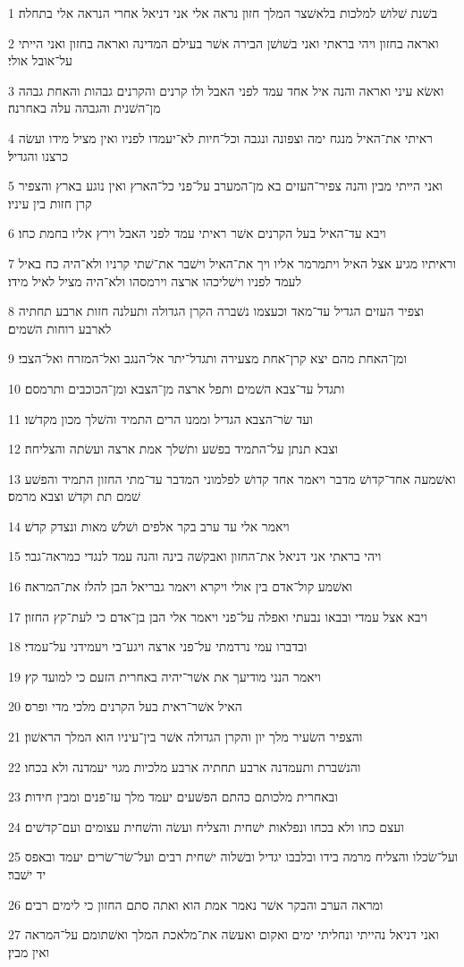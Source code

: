 \par 1 בשׁנת שׁלושׁ למלכות בלאשׁצר המלך חזון נראה אלי אני דניאל אחרי הנראה אלי בתחלה׃
\par 2 ואראה בחזון ויהי בראתי ואני בשׁושׁן הבירה אשׁר בעילם המדינה ואראה בחזון ואני הייתי על־אובל אולי׃
\par 3 ואשׂא עיני ואראה והנה איל אחד עמד לפני האבל ולו קרנים והקרנים גבהות והאחת גבהה מן־השׁנית והגבהה עלה באחרנה׃
\par 4 ראיתי את־האיל מנגח ימה וצפונה ונגבה וכל־חיות לא־יעמדו לפניו ואין מציל מידו ועשׂה כרצנו והגדיל׃
\par 5 ואני הייתי מבין והנה צפיר־העזים בא מן־המערב על־פני כל־הארץ ואין נוגע בארץ והצפיר קרן חזות בין עיניו׃
\par 6 ויבא עד־האיל בעל הקרנים אשׁר ראיתי עמד לפני האבל וירץ אליו בחמת כחו׃
\par 7 וראיתיו מגיע אצל האיל ויתמרמר אליו ויך את־האיל וישׁבר את־שׁתי קרניו ולא־היה כח באיל לעמד לפניו וישׁליכהו ארצה וירמסהו ולא־היה מציל לאיל מידו׃
\par 8 וצפיר העזים הגדיל עד־מאד וכעצמו נשׁברה הקרן הגדולה ותעלנה חזות ארבע תחתיה לארבע רוחות השׁמים׃
\par 9 ומן־האחת מהם יצא קרן־אחת מצעירה ותגדל־יתר אל־הנגב ואל־המזרח ואל־הצבי׃
\par 10 ותגדל עד־צבא השׁמים ותפל ארצה מן־הצבא ומן־הכוכבים ותרמסם׃
\par 11 ועד שׂר־הצבא הגדיל וממנו הרים התמיד והשׁלך מכון מקדשׁו׃
\par 12 וצבא תנתן על־התמיד בפשׁע ותשׁלך אמת ארצה ועשׂתה והצליחה׃
\par 13 ואשׁמעה אחד־קדושׁ מדבר ויאמר אחד קדושׁ לפלמוני המדבר עד־מתי החזון התמיד והפשׁע שׁמם תת וקדשׁ וצבא מרמס׃
\par 14 ויאמר אלי עד ערב בקר אלפים ושׁלשׁ מאות ונצדק קדשׁ׃
\par 15 ויהי בראתי אני דניאל את־החזון ואבקשׁה בינה והנה עמד לנגדי כמראה־גבר׃
\par 16 ואשׁמע קול־אדם בין אולי ויקרא ויאמר גבריאל הבן להלז את־המראה׃
\par 17 ויבא אצל עמדי ובבאו נבעתי ואפלה על־פני ויאמר אלי הבן בן־אדם כי לעת־קץ החזון׃
\par 18 ובדברו עמי נרדמתי על־פני ארצה ויגע־בי ויעמידני על־עמדי׃
\par 19 ויאמר הנני מודיעך את אשׁר־יהיה באחרית הזעם כי למועד קץ׃
\par 20 האיל אשׁר־ראית בעל הקרנים מלכי מדי ופרס׃
\par 21 והצפיר השׂעיר מלך יון והקרן הגדולה אשׁר בין־עיניו הוא המלך הראשׁון׃
\par 22 והנשׁברת ותעמדנה ארבע תחתיה ארבע מלכיות מגוי יעמדנה ולא בכחו׃
\par 23 ובאחרית מלכותם כהתם הפשׁעים יעמד מלך עז־פנים ומבין חידות׃
\par 24 ועצם כחו ולא בכחו ונפלאות ישׁחית והצליח ועשׂה והשׁחית עצומים ועם־קדשׁים׃
\par 25 ועל־שׂכלו והצליח מרמה בידו ובלבבו יגדיל ובשׁלוה ישׁחית רבים ועל־שׂר־שׂרים יעמד ובאפס יד ישׁבר׃
\par 26 ומראה הערב והבקר אשׁר נאמר אמת הוא ואתה סתם החזון כי לימים רבים׃
\par 27 ואני דניאל נהייתי ונחליתי ימים ואקום ואעשׂה את־מלאכת המלך ואשׁתומם על־המראה ואין מבין׃

